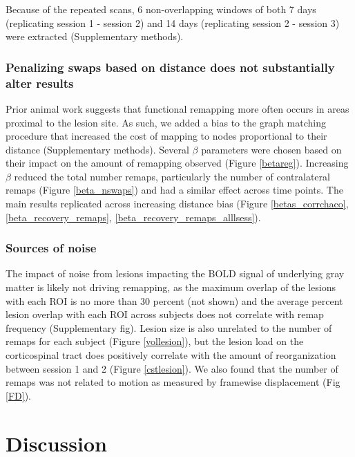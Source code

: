 \documentclass[10pt]{article}
\begin{document}
	Because of the repeated scans, 6 non-overlapping windows of both 7 days (replicating session 1 - session 2) and 14 days (replicating session 2 - session 3) were extracted (Supplementary methods). 
	
	\subsubsection*{Penalizing swaps based on distance does not substantially alter results }
	Prior animal work suggests that functional remapping more often occurs in areas proximal to the lesion site. As such, we added a bias to the graph matching procedure that increased the cost of mapping to nodes proportional to their distance (Supplementary methods). Several $\beta$ parameters were chosen based on their impact on the amount of remapping observed (Figure \ref{betareg}). Increasing $\beta$ reduced the total number remaps, particularly the number of contralateral remaps (Figure \ref{beta_nswaps}) and had a similar effect across time points. The main results replicated across increasing distance bias (Figure \ref{betas_corrchaco}, \ref{beta_recovery_remaps}, \ref{beta_recovery_remaps_alllsess}).
			
	\subsubsection*{Sources of noise}
	The impact of noise from lesions impacting the  BOLD signal of underlying gray matter is likely not driving remapping, as the maximum overlap of the lesions with each ROI is no more than 30 percent (not shown) and the average percent lesion overlap with each ROI across subjects does not correlate with remap frequency (Supplementary fig). Lesion size is also unrelated to the number of remaps for each subject (Figure \ref{vollesion}), but the lesion load on the corticospinal tract does positively correlate with the amount of reorganization between session 1 and 2 (Figure \ref{cstlesion}). We also found that the number of remaps was not related to motion as measured by framewise displacement (Fig \ref{FD}).
	
	

\section*{Discussion}
	
	
\end{document}

